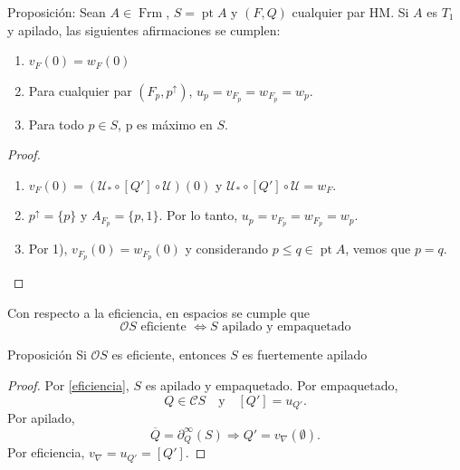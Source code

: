 \documentclass[compress,12pt]{beamer}
\DeclareMathOperator{\pt}{pt}
\DeclareMathOperator{\Frm}{Frm}
\begin{document}
\begin{frame}
\begin{block}{Proposición:}
Sean $A\in \Frm$, $S=\pt A$ y $(F, Q)$ cualquier par HM. Si $A$ es $T_1$ y apilado, las siguientes afirmaciones se cumplen:
\begin{enumerate}
\item $v_F(0)=w_F(0)$
\item Para cualquier par $(F_p, p^\uparrow)$, $u_p=v_{F_p}=w_{F_p}=w_p$.
\item Para todo $p\in S$, p es máximo en $S$.
\end{enumerate}
\end{block}

\begin{proof}
\begin{enumerate}
\item $v_F(0)=(\mathcal{U}_*\circ [Q']\circ \mathcal{U})(0)$ y $\mathcal{U}_*\circ[Q']\circ\mathcal{U}=w_F$.
\item $p^\uparrow=\{p\}$ y $A_{F_p}=\{p,1\}$. Por lo tanto, $u_p=v_{F_p}=w_{F_p}=w_p$. 
\item Por 1), $v_{F_p}(0)=w_{F_p}(0)$ y considerando $p\leq q\in \pt A$, vemos que $p=q$.
\end{enumerate}
\end{proof}
\end{frame}

\begin{frame}
Con respecto a la eficiencia, en espacios se cumple que
\begin{equation}\label{eficiencia}
\mathcal{O}S\text{ eficiente }\iff S \text{ apilado y empaquetado}
\end{equation}

\begin{block}{Proposición}
Si $\mathcal{O}S$ es eficiente, entonces $S$ es fuertemente apilado
\end{block}

\begin{proof}
Por \eqref{eficiencia}, $S$ es apilado y empaquetado. Por empaquetado, 
\[
Q\in \mathcal{C}S \quad\text{y}\quad [Q']=u_{Q'}.
\]
Por apilado,
\[
\overline{Q}=\partial_Q^\infty(S)\Rightarrow Q'=v_\nabla(\emptyset).
\]
Por eficiencia, $v_\nabla=u_{Q'}=[Q']$.
\end{proof}
\end{frame}
\end{document}
